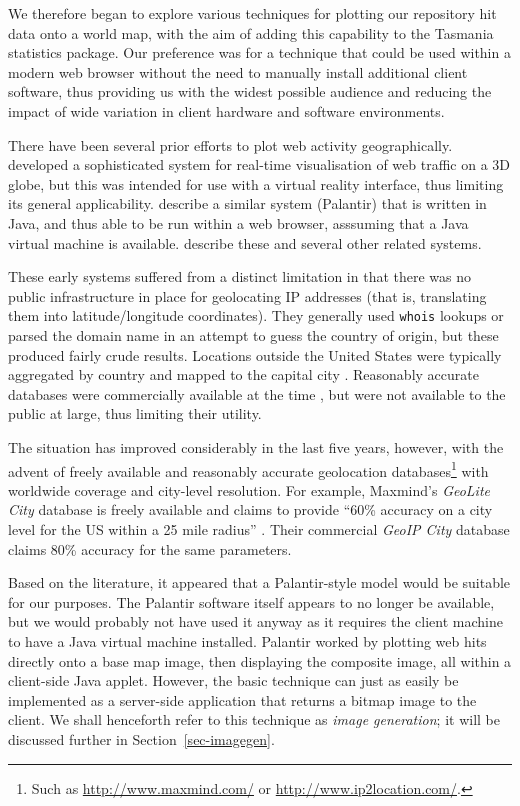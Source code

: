 \documentclass[acmtocl,acmnow]{acmtrans2m}
\begin{document}
We therefore began to explore various techniques for plotting our
repository hit data onto a world map, with the aim of adding this
capability to the Tasmania statistics package. Our preference was for a
technique that could be used within a modern web browser without the
need to manually install additional client software, thus providing us
with the widest possible audience and reducing the impact of wide
variation in client hardware and software environments.

There have been several prior efforts to plot web activity
geographically.  developed a sophisticated
system for real-time visualisation of web traffic on a 3D globe, but
this was intended for use with a virtual reality interface, thus
limiting its general applicability. 
describe a similar system (Palantir) that is written in Java, and thus
able to be run within a web browser, asssuming that a Java virtual
machine is available. 
describe these and several other related systems.

These early systems suffered from a distinct limitation in that there
was no public infrastructure in place for geolocating IP addresses (that
is, translating them into latitude/longitude coordinates). They
generally used \texttt{whois} lookups or parsed the domain name in an
attempt to guess the country of origin, but these produced fairly crude
results. Locations outside the United States were typically aggregated
by country and mapped to the capital city
\cite{Lamm-SE-1996-webvis,Papa-N-1998-Palantir}. Reasonably accurate
databases were commercially available at the time \cite[p.\
1466]{Lamm-SE-1996-webvis}, but were not available to the public at
large, thus limiting their utility.

The situation has improved considerably in the last five years, however,
with the advent of freely available and reasonably accurate geolocation
databases\footnote{Such as \url{http://www.maxmind.com/} or
\url{http://www.ip2location.com/}.} with worldwide coverage and
city-level resolution. For example, Maxmind's \emph{GeoLite City}
database is freely available and claims to provide ``60\% accuracy on a
city level for the US within a 25 mile radius''
\cite{Maxm-G-2006-GeoLiteCity}. Their commercial \emph{GeoIP City}
database claims 80\% accuracy for the same parameters.

Based on the literature, it appeared that a Palantir-style model would
be suitable for our purposes. The Palantir software itself appears to no
longer be available, but we would probably not have used it anyway as it
requires the client machine to have a Java virtual machine installed.
Palantir worked by plotting web hits directly onto a base map image,
then displaying the composite image, all within a client-side Java
applet. However, the basic technique can just as easily be implemented
as a server-side application that returns a bitmap image to the client.
We shall henceforth refer to this technique as \emph{image generation};
it will be discussed further in Section~\ref{sec-imagegen}.
\end{document}
